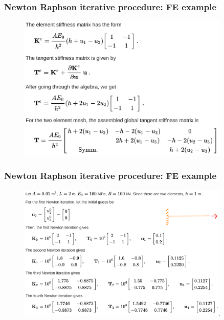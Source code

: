 \documentclass[notes]{beamer}
\begin{document}
\begin{frame}
\frametitle{Newton Raphson iterative procedure: FE example}
	\begin{figure}[ht]
		\centering
		\includegraphics[width=0.9\textwidth]{figs/nonlinear-stiffness-matrix.png}
	\end{figure}
\end{frame}

\begin{frame}
\frametitle{Newton Raphson iterative procedure: FE example}
\begin{figure}[ht]
	\centering
	\includegraphics[width=0.9\textwidth]{figs/nr-nonlinear.png}
\end{figure}
\end{frame}
\end{document}
